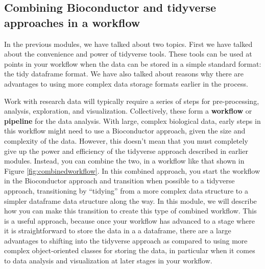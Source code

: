 \documentclass[]{tufte-book}
\begin{document}
\hypertarget{combining-bioconductor-and-tidyverse-approaches-in-a-workflow}{%
\subsection{Combining Bioconductor and tidyverse approaches in a workflow}\label{combining-bioconductor-and-tidyverse-approaches-in-a-workflow}}

In the previous modules, we have talked about two topics. First we have talked about the convenience and power of tidyverse tools. These tools can be used at points in your workflow when the data can be stored in a simple standard format: the tidy dataframe format. We have also talked about reasons why there are advantages to using more complex data storage formats earlier in the process.

Work with research data will typically require a series of steps for
pre-processing, analysis, exploration, and visualization. Collectively, these
form a \textbf{workflow} or \textbf{pipeline} for the data analysis. With large, complex
biological data, early steps in this workflow might need to use a Bioconductor
approach, given the size and complexity of the data. However, this doesn't mean
that you must completely give up the power and efficiency of the tidyverse
approach described in earlier modules. Instead, you can combine the two, in a
workflow like that shown in Figure \ref{fig:combinedworkflow}. In this combined
approach, you start the workflow in the Bioconductor approach and transition
when possible to a tidyverse approach, transitioning by ``tidying'' from a more
complex data structure to a simpler dataframe data structure along the way. In
this module, we will describe how you can make this transition to create this
type of combined workflow. This is a useful approach, because once your workflow
has advanced to a stage where it is straightforward to store the data in a a
dataframe, there are a large advantages to shifting into the tidyverse approach
as compared to using more complex object-oriented classes for storing the data,
in particular when it comes to data analysis and visualization at later stages
in your workflow.
\end{document}
